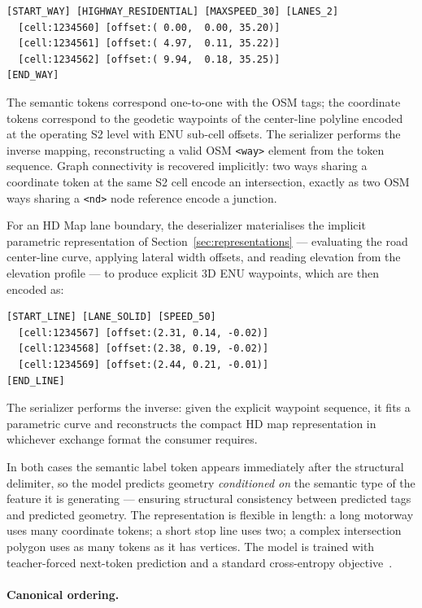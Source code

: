 \documentclass{book}
\begin{document}
\begin{verbatim}
[START_WAY] [HIGHWAY_RESIDENTIAL] [MAXSPEED_30] [LANES_2]
  [cell:1234560] [offset:( 0.00,  0.00, 35.20)]
  [cell:1234561] [offset:( 4.97,  0.11, 35.22)]
  [cell:1234562] [offset:( 9.94,  0.18, 35.25)]
[END_WAY]
\end{verbatim}

\noindent The semantic tokens correspond one-to-one with the
OSM tags; the coordinate tokens correspond to the geodetic
waypoints of the center-line polyline encoded at the
operating S2 level with ENU sub-cell offsets.  The
serializer performs the inverse mapping, reconstructing a
valid OSM \texttt{<way>} element from the token sequence.
Graph connectivity is recovered implicitly: two ways sharing
a coordinate token at the same S2 cell encode an intersection,
exactly as two OSM ways sharing a \texttt{<nd>} node
reference encode a junction.

For an HD Map lane boundary, the deserializer materialises
the implicit parametric representation of
Section~\ref{sec:representations} --- evaluating the road
center-line curve, applying lateral width offsets, and
reading elevation from the elevation profile --- to produce
explicit 3D ENU waypoints, which are then encoded as:

\begin{verbatim}
[START_LINE] [LANE_SOLID] [SPEED_50]
  [cell:1234567] [offset:(2.31, 0.14, -0.02)]
  [cell:1234568] [offset:(2.38, 0.19, -0.02)]
  [cell:1234569] [offset:(2.44, 0.21, -0.01)]
[END_LINE]
\end{verbatim}

\noindent The serializer performs the inverse: given the
explicit waypoint sequence, it fits a parametric curve and
reconstructs the compact HD map representation in whichever
exchange format the consumer requires.

In both cases the semantic label token appears immediately
after the structural delimiter, so the model predicts
geometry \emph{conditioned on} the semantic type of the
feature it is generating --- ensuring structural consistency
between predicted tags and predicted geometry.  The
representation is flexible in length: a long motorway uses
many coordinate tokens; a short stop line uses two; a
complex intersection polygon uses as many tokens as it has
vertices.  The model is trained with teacher-forced
next-token prediction and a standard cross-entropy
objective~\cite{liao2022maptr}.

\paragraph{Canonical ordering.}
\end{document}
